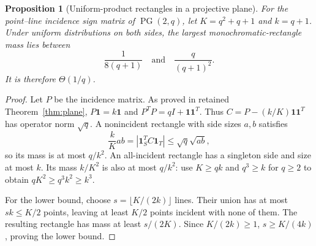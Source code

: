 \documentclass[11pt]{article}
\newtheorem{proposition}[theorem]{Proposition}
\newcommand{\1}{\mathbf 1}
\begin{document}
\begin{proposition}[Uniform-product rectangles in a projective plane]\label{prop:pg-rect}
For the point--line incidence sign matrix of $\operatorname{PG}(2,q)$, let $K=q^2+q+1$ and $k=q+1$. Under uniform distributions on both sides, the largest monochromatic-rectangle mass lies between
\[
 \frac1{8(q+1)}\quad\text{and}\quad\frac{q}{(q+1)^2}.
\]
It is therefore $\Theta(1/q)$.
\end{proposition}
\begin{proof}
Let $P$ be the incidence matrix. As proved in retained Theorem~\ref{thm:plane}, $P\1=k\1$ and $P^TP=qI+\1\1^T$. Thus $C=P-(k/K)\1\1^T$ has operator norm $\sqrt q$. A nonincident rectangle with side sizes $a,b$ satisfies
\[
 \frac{k}{K}ab=|\1_S^TC\1_T|\le\sqrt q\sqrt{ab},
\]
so its mass is at most $q/k^2$. An all-incident rectangle has a singleton side and size at most $k$. Its mass $k/K^2$ is also at most $q/k^2$: use $K\ge qk$ and $q^3\ge k$ for $q\ge2$ to obtain $qK^2\ge q^3k^2\ge k^3$.

For the lower bound, choose $s=\lfloor K/(2k)\rfloor$ lines. Their union has at most $sk\le K/2$ points, leaving at least $K/2$ points incident with none of them. The resulting rectangle has mass at least $s/(2K)$. Since $K/(2k)\ge1$, $s\ge K/(4k)$, proving the lower bound.
\end{proof}
\end{document}
